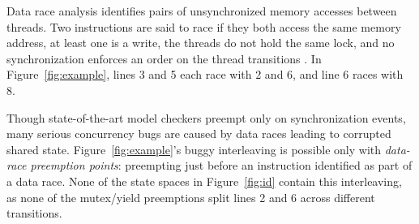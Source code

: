 Data race analysis \cite{eraser} identifies pairs of unsynchronized memory accesses between threads.
Two instructions are said to race if
they both access the same memory address,
at least one is a write,
the threads do not hold the same lock,
and no synchronization enforces an order on the thread transitions .
In Figure~\ref{fig:example}, lines 3 and 5 each race with 2 and 6, and line 6 races with 8.



Though state-of-the-art model checkers preempt only on synchronization events,
many serious concurrency bugs are caused by data races leading to corrupted shared state.
Figure~\ref{fig:example}'s buggy interleaving is possible only with {\em data-race preemption points}:
preempting just before an instruction identified as part of a data race.
None of the state spaces in Figure~\ref{fig:id} contain this interleaving,
as none of the mutex/yield preemptions split lines 2 and 6 across different transitions.


